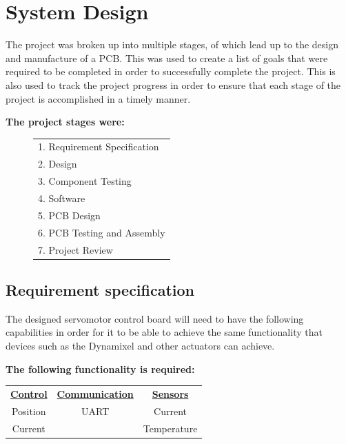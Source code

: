\chapter{System Design}
\vspace{-3mm}
The project was broken up into multiple stages, of which lead up to the design and manufacture of a PCB. This was used to create a list of goals that were required to be completed in order to successfully complete the project. This is also used to track the project progress in order to ensure that each stage of the project is accomplished in a timely manner.

\vspace{4mm}
\textbf{The project stages were:}
\begin{figure}[H]
\Centering
\begin{tabular}{l}
    1. Requirement Specification\\
    2. Design\\
    3. Component Testing\\
    4. Software\\
    5. PCB Design\\
    6. PCB Testing and Assembly\\
    7. Project Review\\
\end{tabular}
\end{figure}
\vspace{-7mm}
    
\section{Requirement specification}
The designed servomotor control board will need to have the following capabilities in order for it to be able to achieve the same functionality that devices such as the Dynamixel and other actuators can achieve. 

\vspace{7mm}
\textbf{The following functionality is required:}
\begin{table}[H]
    \centering
    \begin{tabular}{|c |c| c|}
    \hline
        \textbf{\underline{Control}} & \textbf{\underline{Communication}} & \textbf{\underline{Sensors}}\\
        Position  & UART  & Current\\
        Current & & Temperature\\
        \hline
    \end{tabular}
\end{table}
\newpage
